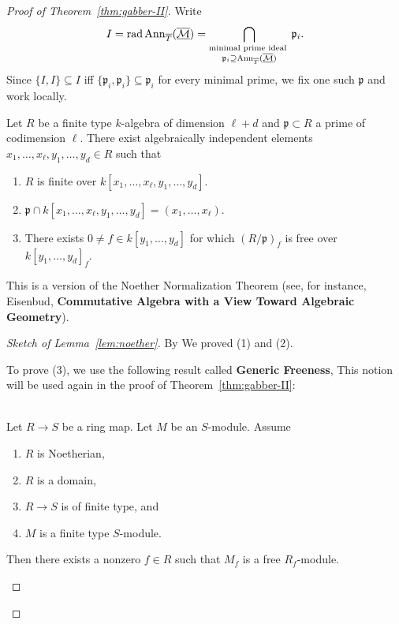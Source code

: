 \begin{proof}[Proof of Theorem~\ref{thm:gabber-II}]



	Write
	\[
		I=\operatorname{rad}\operatorname{Ann}_{\overline T}(\overline{\underline{\mathcal M}})
		= \bigcap_{\substack{
				\text{minimal prime ideal } \\
				\mathfrak p_i \supseteq \operatorname{Ann}_{\overline T}(\overline{\underline{\mathcal M}})
			}} \mathfrak p_i.
	\]
	Since $\{I,I\}\subseteq I$ iff $\{\mathfrak p_i,\mathfrak p_i\}\subseteq \mathfrak p_i$ for every minimal prime, we fix one such $\mathfrak p$ and work locally.

	\begin{lemma}\label{lem:noether}
		Let $R$ be a finite type $k$-algebra of dimension $\ell+d$ and $\mathfrak p\subset R$ a prime of codimension
		$\ell$. There exist algebraically independent elements $x_1,\dots,x_\ell,y_1,\dots,y_d\in R$ such that
		\begin{enumerate}
			\item $R$ is finite over $k[x_1,\dots,x_\ell,y_1,\dots,y_d]$.
			\item $\mathfrak p\cap k[x_1,\dots,x_\ell,y_1,\dots,y_d]=(x_1,\dots,x_\ell)$.
			\item There exists $0\ne f\in k[y_1,\dots,y_d]$ for which $(R/\mathfrak p)_f$ is free over $k[y_1,\dots,y_d]_f$.
		\end{enumerate}
		\noindent
		This is a version of the Noether Normalization Theorem (see, for instance, Eisenbud,
		\textbf{Commutative Algebra with a View Toward Algebraic Geometry}).
	\end{lemma}

	\begin{proof}[Sketch of Lemma~\ref{lem:noether}]
		By \cite[Theorem 13.3(Noether Normalization).]{eisenbud1995commutative} We proved (1) and (2).

		To prove (3), we use the following result called \textbf{Generic Freeness},
		This notion will be used again in the proof of Theorem~\ref{thm:gabber-II}:

		\begin{lemma}\label{algebra-lemma-generic-flatness-Noetherian}
			\mbox{}\\
			Let $R \to S$ be a ring map.
			Let $M$ be an $S$-module.
			Assume
			\begin{enumerate}
				\item $R$ is Noetherian,
				\item $R$ is a domain,
				\item $R \to S$ is of finite type, and
				\item $M$ is a finite type $S$-module.
			\end{enumerate}
			Then there exists a nonzero $f \in R$ such that
			$M_f$ is a free $R_f$-module.%
		\end{lemma}


\end{proof}
\end{proof}
